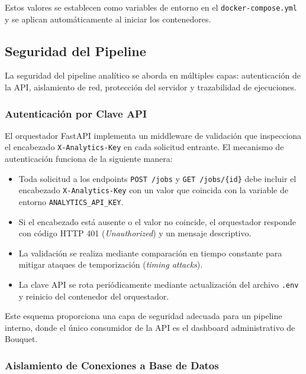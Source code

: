 Estos valores se establecen como variables de entorno en el
\texttt{docker-compose.yml} y se aplican automáticamente al iniciar
los contenedores.

\subsection{Seguridad del Pipeline}

La seguridad del pipeline analítico se aborda en múltiples capas:
autenticación de la API, aislamiento de red, protección del servidor y
trazabilidad de ejecuciones.

\subsubsection{Autenticación por Clave API}

El orquestador FastAPI implementa un middleware de validación que
inspecciona el encabezado \texttt{X-Analytics-Key} en cada solicitud
entrante. El mecanismo de autenticación funciona de la siguiente manera:

\begin{itemize}[leftmargin=1.5em]
  \item Toda solicitud a los endpoints \texttt{POST /jobs} y
  \texttt{GET /jobs/\{id\}} debe incluir el encabezado
  \texttt{X-Analytics-Key} con un valor que coincida con la variable
  de entorno \texttt{ANALYTICS\_API\_KEY}.
  \item Si el encabezado está ausente o el valor no coincide, el
  orquestador responde con código HTTP 401 (\textit{Unauthorized}) y
  un mensaje descriptivo.
  \item La validación se realiza mediante comparación en tiempo
  constante para mitigar ataques de temporización
  (\textit{timing attacks}).
  \item La clave API se rota periódicamente mediante actualización del
  archivo \texttt{.env} y reinicio del contenedor del orquestador.
\end{itemize}

Este esquema proporciona una capa de seguridad adecuada para un
pipeline interno, donde el único consumidor de la API es el dashboard
administrativo de Bouquet.

\subsubsection{Aislamiento de Conexiones a Base de Datos}

